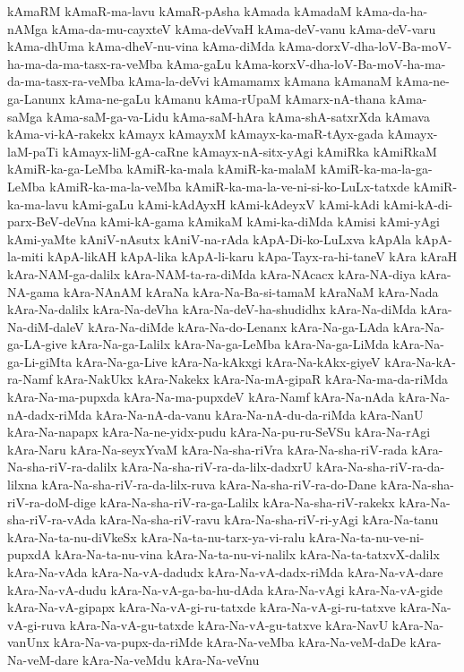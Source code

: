 {kAmaRM
kAmaR-ma-lavu
kAmaR-pAsha
kAmada
kAmadaM
kAma-da-ha-nAMga
kAma-da-mu-cayxteV
kAma-deVvaH
kAma-deV-vanu
kAma-deV-varu
kAma-dhUma
kAma-dheV-nu-vina
kAma-diMda
kAma-dorxV-dha-loV-Ba-moV-ha-ma-da-ma-tasx-ra-veMba
kAma-gaLu
kAma-korxV-dha-loV-Ba-moV-ha-ma-da-ma-tasx-ra-veMba
kAma-la-deVvi
kAmamamx
kAmana
kAmanaM
kAma-ne-ga-Lanunx
kAma-ne-gaLu
kAmanu
kAma-rUpaM
kAmarx-nA-thana
kAma-saMga
kAma-saM-ga-va-Lidu
kAma-saM-hAra
kAma-shA-satxrXda
kAmava
kAma-vi-kA-rakekx
kAmayx
kAmayxM
kAmayx-ka-maR-tAyx-gada
kAmayx-laM-paTi
kAmayx-liM-gA-caRne
kAmayx-nA-sitx-yAgi
kAmiRka
kAmiRkaM
kAmiR-ka-ga-LeMba
kAmiR-ka-mala
kAmiR-ka-malaM
kAmiR-ka-ma-la-ga-LeMba
kAmiR-ka-ma-la-veMba
kAmiR-ka-ma-la-ve-ni-si-ko-LuLx-tatxde
kAmiR-ka-ma-lavu
kAmi-gaLu
kAmi-kAdAyxH
kAmi-kAdeyxV
kAmi-kAdi
kAmi-kA-di-parx-BeV-deVna
kAmi-kA-gama
kAmikaM
kAmi-ka-diMda
kAmisi
kAmi-yAgi
kAmi-yaMte
kAniV-nAsutx
kAniV-na-rAda
kApA-Di-ko-LuLxva
kApAla
kApA-la-miti
kApA-likAH
kApA-lika
kApA-li-karu
kApa-Tayx-ra-hi-taneV
kAra
kAraH
kAra-NAM-ga-dalilx
kAra-NAM-ta-ra-diMda
kAra-NAcacx
kAra-NA-diya
kAra-NA-gama
kAra-NAnAM
kAraNa
kAra-Na-Ba-si-tamaM
kAraNaM
kAra-Nada
kAra-Na-dalilx
kAra-Na-deVha
kAra-Na-deV-ha-shudidhx
kAra-Na-diMda
kAra-Na-diM-daleV
kAra-Na-diMde
kAra-Na-do-Lenanx
kAra-Na-ga-LAda
kAra-Na-ga-LA-give
kAra-Na-ga-Lalilx
kAra-Na-ga-LeMba
kAra-Na-ga-LiMda
kAra-Na-ga-Li-giMta
kAra-Na-ga-Live
kAra-Na-kAkxgi
kAra-Na-kAkx-giyeV
kAra-Na-kA-ra-Namf
kAra-NakUkx
kAra-Nakekx
kAra-Na-mA-gipaR
kAra-Na-ma-da-riMda
kAra-Na-ma-pupxda
kAra-Na-ma-pupxdeV
kAra-Namf
kAra-Na-nAda
kAra-Na-nA-dadx-riMda
kAra-Na-nA-da-vanu
kAra-Na-nA-du-da-riMda
kAra-NanU
kAra-Na-napapx
kAra-Na-ne-yidx-pudu
kAra-Na-pu-ru-SeVSu
kAra-Na-rAgi
kAra-Naru
kAra-Na-seyxYvaM
kAra-Na-sha-riVra
kAra-Na-sha-riV-rada
kAra-Na-sha-riV-ra-dalilx
kAra-Na-sha-riV-ra-da-lilx-dadxrU
kAra-Na-sha-riV-ra-da-lilxna
kAra-Na-sha-riV-ra-da-lilx-ruva
kAra-Na-sha-riV-ra-do-Dane
kAra-Na-sha-riV-ra-doM-dige
kAra-Na-sha-riV-ra-ga-Lalilx
kAra-Na-sha-riV-rakekx
kAra-Na-sha-riV-ra-vAda
kAra-Na-sha-riV-ravu
kAra-Na-sha-riV-ri-yAgi
kAra-Na-tanu
kAra-Na-ta-nu-diVkeSx
kAra-Na-ta-nu-tarx-ya-vi-ralu
kAra-Na-ta-nu-ve-ni-pupxdA
kAra-Na-ta-nu-vina
kAra-Na-ta-nu-vi-nalilx
kAra-Na-ta-tatxvX-dalilx
kAra-Na-vAda
kAra-Na-vA-dadudx
kAra-Na-vA-dadx-riMda
kAra-Na-vA-dare
kAra-Na-vA-dudu
kAra-Na-vA-ga-ba-hu-dAda
kAra-Na-vAgi
kAra-Na-vA-gide
kAra-Na-vA-gipapx
kAra-Na-vA-gi-ru-tatxde
kAra-Na-vA-gi-ru-tatxve
kAra-Na-vA-gi-ruva
kAra-Na-vA-gu-tatxde
kAra-Na-vA-gu-tatxve
kAra-NavU
kAra-Na-vanUnx
kAra-Na-va-pupx-da-riMde
kAra-Na-veMba
kAra-Na-veM-daDe
kAra-Na-veM-dare
kAra-Na-veMdu
kAra-Na-veVnu
}
